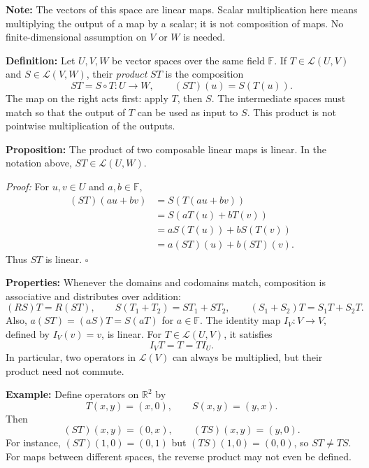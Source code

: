 \documentclass[a4paper,11pt,abstract=true]{scrartcl}
\theoremstyle{dotlessP}
\theoremstyle{dotlessS}
\theoremstyle{remark}
\theoremstyle{definition}
\begin{document}
\begin{claim_box}
\textbf{Note:} The vectors of this space are linear maps.
Scalar multiplication here means multiplying the output of a map by a
scalar; it is not composition of maps. No finite-dimensional assumption
on $V$ or $W$ is needed.
\end{claim_box}

\begin{definition_box}
\textbf{Definition:} Let $U,V,W$ be vector
spaces over the same field $\mathbb{F}$. If $T\in\mathcal{L}(U,V)$ and
$S\in\mathcal{L}(V,W)$, their \emph{product} $ST$ is the composition
\[
ST=S\circ T:U\longrightarrow W,
\qquad (ST)(u)=S(T(u)).
\]
The map on the right acts first: apply $T$, then $S$. The intermediate
spaces must match so that the output of $T$ can be used as input to $S$.
This product is not pointwise multiplication of the outputs.
\end{definition_box}

\begin{problem_box}
\textbf{Proposition:} The product of two composable linear maps is
linear. In the notation above, $ST\in\mathcal{L}(U,W)$.

\end{problem_box}

\begin{claim_box}
\textit{Proof:} For $u,v\in U$ and $a,b\in\mathbb{F}$,
\[
\begin{aligned}
(ST)(au+bv)&=S(T(au+bv))\\
&=S(aT(u)+bT(v))\\
&=aS(T(u))+bS(T(v))\\
&=a(ST)(u)+b(ST)(v).
\end{aligned}
\]
Thus $ST$ is linear. \hfill$\square$
\end{claim_box}

\begin{claim_box}
\textbf{Properties:} Whenever the domains and codomains match,
composition is associative and distributes over addition:
\[
(RS)T=R(ST),\qquad
S(T_1+T_2)=ST_1+ST_2,\qquad
(S_1+S_2)T=S_1T+S_2T.
\]
Also, $a(ST)=(aS)T=S(aT)$ for $a\in\mathbb{F}$.
The identity map $I_V:V\longrightarrow V$, defined by $I_V(v)=v$, is
linear. For $T\in\mathcal{L}(U,V)$, it satisfies
\[
I_V T=T=T I_U.
\]
In particular, two operators in $\mathcal{L}(V)$ can always be multiplied,
but their product need not commute.
\end{claim_box}

\begin{example_box}
\textbf{Example:} Define operators on $\mathbb{R}^2$ by
\[
T(x,y)=(x,0),\qquad S(x,y)=(y,x).
\]
Then
\[
(ST)(x,y)=(0,x),\qquad (TS)(x,y)=(y,0).
\]
For instance, $(ST)(1,0)=(0,1)$ but $(TS)(1,0)=(0,0)$, so $ST\neq TS$.
For maps between different spaces, the reverse product may not even be
defined.
\end{example_box}
\end{document}
